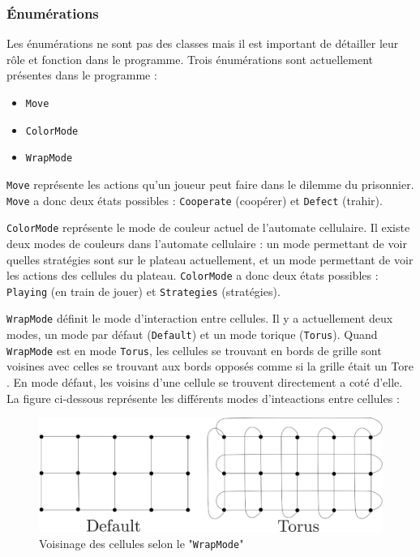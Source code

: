 \documentclass[a4paper]{article}
\begin{document}
\pagebreak
\subsubsection{Énumérations}
Les énumérations ne sont pas des classes mais il est important de détailler leur rôle et fonction dans le programme. Trois énumérations sont actuellement présentes dans le programme :

\begin{itemize}
    \item \texttt{Move}
    \item \texttt{ColorMode}
    \item \texttt{WrapMode}
\end{itemize}

\texttt{Move} représente les actions qu'un joueur peut faire dans le dilemme du prisonnier. \texttt{Move} a donc deux états possibles : \texttt{Cooperate} (coopérer) et \texttt{Defect} (trahir).

\texttt{ColorMode} représente le mode de couleur actuel de l'automate cellulaire. Il existe deux modes de couleurs dans l'automate cellulaire : un mode permettant de voir quelles stratégies sont sur le plateau actuellement, et un mode permettant de voir les actions des cellules du plateau. \texttt{ColorMode} a donc deux états possibles : \texttt{Playing} (en train de jouer) et \texttt{Strategies} (stratégies).

\texttt{WrapMode} définit le mode d'interaction entre cellules. Il y a actuellement deux modes, un mode par défaut (\texttt{Default}) et un mode torique (\texttt{Torus}). Quand \texttt{WrapMode} est en mode \texttt{Torus}, les cellules se trouvant en bords de grille sont voisines avec celles se trouvant aux bords opposés comme si la grille était un Tore \cite{Torus}. En mode défaut, les voisins d'une cellule se trouvent directement a coté d'elle. La figure ci-dessous représente les différents modes d'inteactions entre cellules :

\begin{figure}[htp]
    \centering
    \includegraphics[width=\linewidth]{wrapmode.png}
    \caption{Voisinage des cellules selon le "\texttt{WrapMode}"}
\end{figure}
\end{document}
